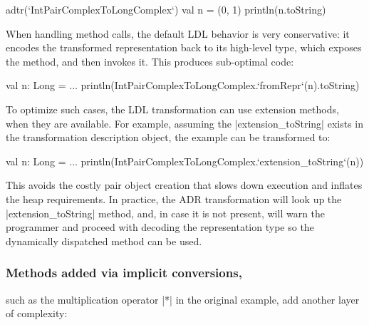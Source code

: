\begin{lstlisting-nobreak}
adtr(`IntPairComplexToLongComplex`) {
  val n = (0, 1)
  println(n.toString)
}
\end{lstlisting-nobreak}


When handling method calls, the default LDL behavior is very conservative: it encodes the transformed representation back to its high-level type, which exposes the method, and then invokes it. This produces sub-optimal code:

\begin{lstlisting-nobreak}
val n: Long = ...
println(IntPairComplexToLongComplex.`fromRepr`(n).toString)
\end{lstlisting-nobreak}

To optimize such cases, the LDL transformation can use extension methods, when they are available. For example, assuming the |extension_toString| exists in the transformation description object, the example can be transformed to:

\begin{lstlisting-nobreak}
val n: Long = ...
println(IntPairComplexToLongComplex.`extension_toString`(n))
\end{lstlisting-nobreak}

This avoids the costly pair object creation that slows down execution and inflates the heap requirements. In practice, the ADR transformation will look up the |extension_toString| method, and, in case it is not present, will warn the programmer and proceed with decoding the representation type so the dynamically dispatched method can be used.

\subsubsection{Methods added via implicit conversions,} such as the multiplication operator |*| in the original example, add another layer of complexity:

